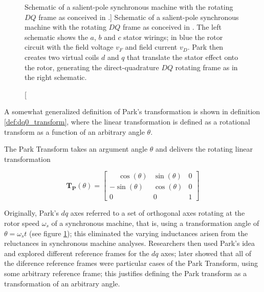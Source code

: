\begin{figure}[ht]
{
}
\caption
[Schematic of a salient-pole synchronous machine with the rotating $DQ$ frame as conceived in \cite{Park1929}.]
{Schematic of a salient-pole synchronous machine with the rotating $DQ$ frame as conceived in \cite{Park1929}. The left schematic shows the $a$, $b$ and $c$ stator wirings; in blue the rotor circuit with the field voltage $v_F$ and field current $v_D$. Park then creates two virtual coils $d$ and $q$ that translate the stator effect onto the rotor, generating the direct-quadrature $DQ$ rotating frame as in the right schematic.}
	\label{fig:park_transform_rotor}
\end{figure} %

	A somewhat generalized definition of Park's transformation is shown in definition \ref{def:dq0_transform}, where the linear transformation is defined as a rotational transform as a function of an arbitrary angle $\theta$.

\begin{definition}\label{def:park_transform} The Park Transform takes an argument angle $\theta$ and delivers the rotating linear transformation

\begin{equation}
\mathbf{T_P}\left(\theta\right) = 
\left[\begin{array}{ccc}
\phantom{-}\cos\left(\theta\right) & \sin\left(\theta\right) & 0 \\[5mm]
-\sin\left(\theta\right) & \cos\left(\theta\right) & 0 \\[5mm]
0 & 0 & 1
\end{array}\right]
\end{equation}

\end{definition}

	Originally, Park's $dq$ axes referred to a set of orthogonal axes rotating at the rotor speed $\omega_s$ of a synchronous machine, that is, using a transformation angle of $\theta = \omega_s t$ (see figure \ref{fig:park_transform_rotor}); this eliminated the varying inductances arisen from the reluctances in synchronous machine analyses. Researchers then used Park's idea  and explored different reference frames for the $dq$ axes; \cite{Krause1965} later showed that all of the diference reference frames were particular cases of the Park Transform, using some arbitrary reference frame; this justifies defining the Park transform as a transformation of an arbitrary angle.


